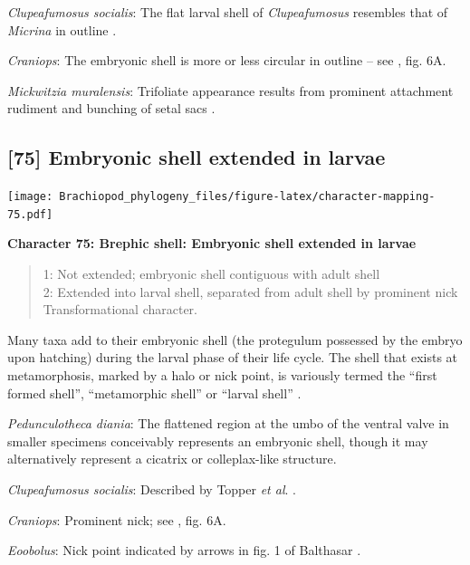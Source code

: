 \documentclass[]{book}
\theoremstyle{definition}
\theoremstyle{definition}
\theoremstyle{definition}
\theoremstyle{remark}
\begin{document}
\emph{Clupeafumosus socialis}: The flat larval shell of
\emph{Clupeafumosus} resembles that of \emph{Micrina} in outline
\citetext{\citealp{Topper2013Reappraisalof}; \citealp[cf.][]{Holmer2011Firstrecord}}.

\emph{Craniops}: The embryonic shell is more or less circular in outline
-- see \citet{Freeman1999Changesin}, fig. 6A.

\emph{Mickwitzia muralensis}: Trifoliate appearance results from
prominent attachment rudiment and bunching of setal sacs
\citep{Balthasar2009Thebrachiopod}.

\hypertarget{embryonic-shell-extended-in-larvae}{%
\subsection*{{[}75{]} Embryonic shell extended in
larvae}\label{embryonic-shell-extended-in-larvae}}

\texttt{[image: Brachiopod\_phylogeny\_files/figure-latex/character-mapping-75.pdf]}

\textbf{Character 75: Brephic shell: Embryonic shell extended in larvae}

\begin{quote}
1: Not extended; embryonic shell contiguous with adult shell\\
2: Extended into larval shell, separated from adult shell by prominent
nick\\
Transformational character.
\end{quote}

Many taxa add to their embryonic shell (the protegulum possessed by the
embryo upon hatching) during the larval phase of their life cycle. The
shell that exists at metamorphosis, marked by a halo or nick point, is
variously termed the ``first formed shell'', ``metamorphic shell'' or
``larval shell'' \citep{Bassett2017Earliestontogeny}.

\emph{Pedunculotheca diania}: The flattened region at the umbo of the
ventral valve in smaller specimens conceivably represents an embryonic
shell, though it may alternatively represent a cicatrix or
colleplax-like structure.

\emph{Clupeafumosus socialis}: Described by Topper \emph{et al}.
\citeyearpar{Topper2013Reappraisalof}.

\emph{Craniops}: Prominent nick; see \citet{Freeman1999Changesin}, fig.
6A.

\emph{Eoobolus}: Nick point indicated by arrows in fig. 1 of Balthasar
\citeyearpar{Balthasar2009Thebrachiopod}.
\end{document}
